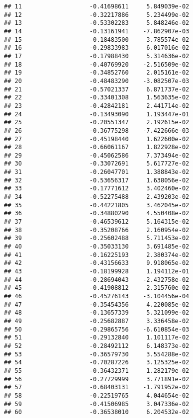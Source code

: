 \documentclass[
]{article}
\begin{document}
\begin{verbatim}
## 11                   -0.41698611     5.849039e-02
## 12                   -0.32217886     5.234499e-02
## 13                   -0.53302283     5.848246e-02
## 14                   -0.13161941    -7.862907e-03
## 15                   -0.18483500     3.785574e-02
## 16                   -0.29833983     6.017016e-02
## 17                   -0.17988430     5.314636e-02
## 18                   -0.40769920    -2.516509e-02
## 19                   -0.34852760     2.015161e-02
## 20                   -0.48483290    -3.082507e-03
## 21                   -0.57021337     6.871737e-02
## 22                   -0.33401308     1.563635e-02
## 23                   -0.42842181     2.441714e-02
## 24                   -0.13493090     1.193447e-01
## 25                   -0.20551347     2.192615e-02
## 26                   -0.36775298    -7.422666e-03
## 27                   -0.45198440     1.622600e-02
## 28                   -0.66061167     1.822928e-02
## 29                   -0.45062586     7.373494e-02
## 30                   -0.33072691     5.617727e-02
## 31                   -0.26047701     1.388843e-02
## 32                   -0.53656317     1.638056e-02
## 33                   -0.17771612     3.402460e-02
## 34                   -0.52275488     2.439203e-02
## 35                   -0.44221805     3.462045e-02
## 36                   -0.34880290     4.550408e-02
## 37                   -0.46539612     5.164315e-02
## 38                   -0.35208766     2.160954e-02
## 39                   -0.25602488     5.711453e-02
## 40                   -0.35033130     3.691485e-02
## 41                   -0.16225193     2.380374e-02
## 42                   -0.43156633     9.918065e-02
## 43                   -0.18199928     1.194112e-01
## 44                   -0.28694043    -2.432758e-02
## 45                   -0.41908812     2.315760e-02
## 46                   -0.45276143    -3.104456e-04
## 47                   -0.35454356     4.220085e-02
## 48                   -0.13657339     5.321099e-02
## 49                   -0.25682887     3.336458e-02
## 50                   -0.29865756    -6.610854e-03
## 51                   -0.29132840     1.101117e-02
## 52                   -0.28492112     6.148373e-02
## 53                   -0.36579730     3.554288e-02
## 54                   -0.70287226     3.125325e-02
## 55                   -0.36432371     1.282179e-02
## 56                   -0.27729999     3.771891e-02
## 57                   -0.68403131    -1.791952e-02
## 58                   -0.22519765     4.044654e-02
## 59                   -0.41506985     3.047336e-02
## 60                   -0.36538010     6.204532e-02

\end{verbatim}
\end{document}
